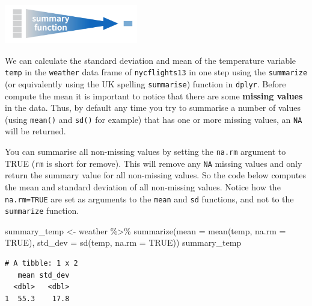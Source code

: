 \documentclass[
  letterpaper,
  DIV=11,
  numbers=noendperiod]{scrartcl}
\newenvironment{Shaded}{\begin{snugshade}}{\end{snugshade}}
\newcommand{\AttributeTok}[1]{\textcolor[rgb]{0.40,0.45,0.13}{#1}}
\newcommand{\ConstantTok}[1]{\textcolor[rgb]{0.56,0.35,0.01}{#1}}
\newcommand{\FunctionTok}[1]{\textcolor[rgb]{0.28,0.35,0.67}{#1}}
\newcommand{\NormalTok}[1]{\textcolor[rgb]{0.00,0.23,0.31}{#1}}
\newcommand{\OtherTok}[1]{\textcolor[rgb]{0.00,0.23,0.31}{#1}}
\newcommand{\SpecialCharTok}[1]{\textcolor[rgb]{0.37,0.37,0.37}{#1}}
\begin{document}
\includegraphics[width=2.29in,height=\textheight]{summary.png}

We can calculate the standard deviation and mean of the temperature
variable \texttt{temp} in the \texttt{weather} data frame of
\texttt{nycflights13} in one step using the \texttt{summarize} (or
equivalently using the UK spelling \texttt{summarise}) function in
\texttt{dplyr}. Before compute the mean it is important to notice that
there are some \textbf{missing values} in the data. Thus, by default any
time you try to summarise a number of values (using \texttt{mean()} and
\texttt{sd()} for example) that has one or more missing values, an
\texttt{NA} will be returned.

You can summarise all non-missing values by setting the \texttt{na.rm}
argument to TRUE (\texttt{rm} is short for remove). This will remove any
\texttt{NA} missing values and only return the summary value for all
non-missing values. So the code below computes the mean and standard
deviation of all non-missing values. Notice how the \texttt{na.rm=TRUE}
are set as arguments to the \texttt{mean} and \texttt{sd} functions, and
not to the \texttt{summarize} function.

\begin{Shaded}
\begin{Highlighting}[]
\NormalTok{summary\_temp }\OtherTok{\textless{}{-}}\NormalTok{ weather }\SpecialCharTok{\%\textgreater{}\%}
  \FunctionTok{summarize}\NormalTok{(}\AttributeTok{mean =} \FunctionTok{mean}\NormalTok{(temp, }\AttributeTok{na.rm =} \ConstantTok{TRUE}\NormalTok{), }\AttributeTok{std\_dev =} \FunctionTok{sd}\NormalTok{(temp, }\AttributeTok{na.rm =} \ConstantTok{TRUE}\NormalTok{))}
\NormalTok{summary\_temp}
\end{Highlighting}
\end{Shaded}

\begin{verbatim}
# A tibble: 1 x 2
   mean std_dev
  <dbl>   <dbl>
1  55.3    17.8
\end{verbatim}
\end{document}
